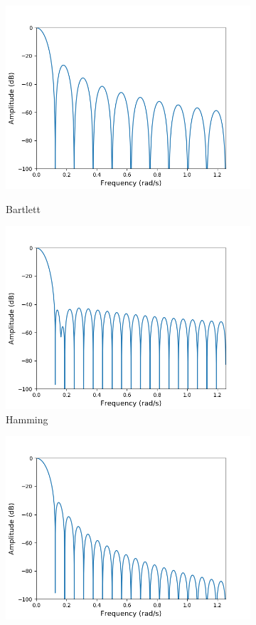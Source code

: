 \begin{figure}
\centering
\begin{subfigure}{0.49\textwidth}
\centering
\includegraphics[width=\textwidth]{figures/dbplots/bartlett.png}
\caption{Bartlett}
\label{fig:bartlett_db}
\includegraphics[width=\textwidth]{figures/dbplots/hamming.png}
\caption{Hamming}
\label{fig:hamming_db}
\end{subfigure}
\begin{subfigure}{0.49\textwidth}
\centering
\includegraphics[width=\textwidth]{figures/dbplots/hann.png}

\end{subfigure}
\end{figure}
